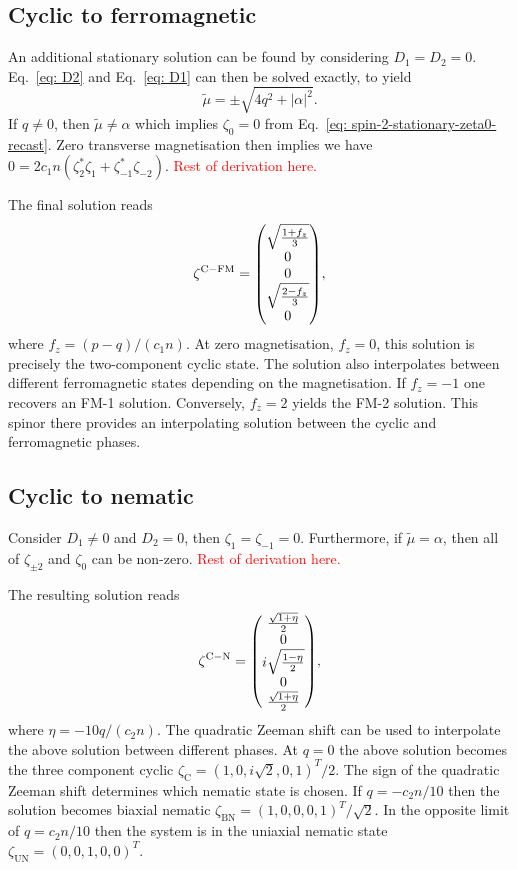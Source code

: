 \subsection{Cyclic to ferromagnetic}
An additional stationary solution can be found by considering \(D_1=D_2=0\).
Eq.~\eqref{eq: D2} and Eq.~\eqref{eq: D1} can then be solved exactly, to yield
\begin{equation}
    \tilde{\mu} = \pm \sqrt{4q^2 + |\alpha|^2}.
\end{equation}
If \(q \neq 0\), then \(\tilde{\mu} \neq \alpha \) which implies \(\zeta_0=0\)
from Eq.~\eqref{eq: spin-2-stationary-zeta0-recast}.
Zero transverse magnetisation then implies we have
\(0 = 2c_1n(\zeta_2^*\zeta_{1} + \zeta_{-1}^*\zeta_{-2})\).
\textcolor{red}{Rest of derivation here.}

The final solution reads
\begin{equation}
    \zeta^\mathrm{C-FM} = \mqty(\sqrt{\frac{1 + f_z}{3}} \\ 0 \\ 0 \\
    \sqrt{\frac{2 - f_z}{3}} \\ 0),
\end{equation}
where \(f_z = (p - q) / (c_1n)\).
At zero magnetisation, \(f_z = 0\), this solution is precisely the two-component
cyclic state.
The solution also interpolates between different ferromagnetic states depending
on the magnetisation.
If \(f_z = -1\) one recovers an FM-1 solution.
Conversely, \(f_z = 2\) yields the FM-2 solution.
This spinor there provides an interpolating solution between the cyclic and
ferromagnetic phases.

\subsection{Cyclic to nematic}
Consider \(D_1 \neq 0\) and \(D_2 = 0\), then \(\zeta_1 = \zeta_{-1} = 0\).
Furthermore, if \(\tilde{\mu} = \alpha \), then all of \(\zeta_{\pm 2}\) and
\(\zeta_0\) can be non-zero.
\textcolor{red}{Rest of derivation here.}

The resulting solution reads
\begin{equation}\label{eq: C-N-interpolating-spinor}
    \zeta^\mathrm{C-N} = \mqty(\frac{\sqrt{1 + \eta}}{2} \\ 0 \\
    i\sqrt{\frac{1 - \eta}{2}} \\ 0 \\ \frac{\sqrt{1 + \eta}}{2}),
\end{equation}
where \(\eta = -10q/(c_2n)\).
The quadratic Zeeman shift can be used to interpolate the above solution between
different phases.
At \(q = 0\) the above solution becomes the three component cyclic
\(\zeta_\mathrm{C} = {(1, 0, i\sqrt{2}, 0, 1)}^T/2\).
The sign of the quadratic Zeeman shift determines which nematic state is chosen.
If \(q = -c_2n/10\) then the solution becomes biaxial nematic
\(\zeta_\mathrm{BN} = {(1, 0, 0, 0, 1)}^T/\sqrt{2}\).
In the opposite limit of \(q = c_2n/10\) then the system is in the uniaxial
nematic state \(\zeta_\mathrm{UN} = {(0, 0, 1, 0, 0)}^T\).

